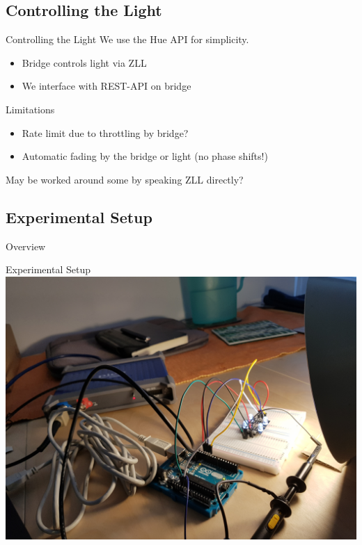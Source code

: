 \documentclass[11pt,t,usepdftitle=false,aspectratio=169]{beamer}
\begin{document}

\subsection{Controlling the Light}%
\label{sub:controlling_the_lights}

\begin{frame}{Controlling the Light}
	We use the Hue API for simplicity.

	\begin{itemize}
		\item Bridge controls light via ZLL
		\item We interface with REST-API on bridge
	\end{itemize}

	\pause
	\begin{block}{Limitations}
		\begin{itemize}
			\item Rate limit due to throttling by bridge?
			\item Automatic fading by the bridge or light (no phase shifts!)
		\end{itemize}
		May be worked around some by speaking ZLL directly?
	\end{block}
\end{frame}

\subsection{Experimental Setup}%
\label{sub:experimental_setup}

\begin{frame}{Overview}
\end{frame}

\begin{frame}{Experimental Setup}
	\includegraphics[trim={0 0 0 12cm},clip]{../experiment/project_setup/20180510_123244.jpg}
\end{frame}
\end{document}
